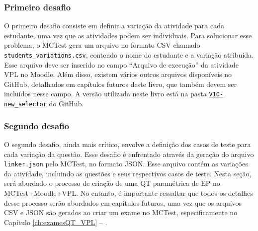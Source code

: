 \subsubsection{Primeiro desafio}

O primeiro desafio consiste em definir a variação da atividade para cada estudante, uma vez que as atividades podem ser individuais. Para solucionar esse problema, o MCTest gera um arquivo no formato CSV chamado \verb|students_variations.csv|, contendo o nome do estudante e a variação atribuída. Esse arquivo deve ser inserido no campo ``Arquivo de execução'' da atividade VPL no Moodle. Além disso, existem vários outros arquivos disponíveis no GitHub, detalhados em capítulos futuros deste livro, que também devem ser incluídos nesse campo. A versão utilizada neste livro está na pasta \href{https://github.com/fzampirolli/mctest/tree/master/VPL_modification}{\texttt{V10-new\_selector}} do GitHub.


\subsubsection{Segundo desafio}

O segundo desafio, ainda mais crítico, envolve a definição dos casos de teste para cada variação da questão. Esse desafio é enfrentado através da geração do arquivo \verb|linker.json| pelo MCTest, no formato JSON. Esse arquivo contém as variações da atividade, incluindo as questões e seus respectivos casos de teste. Nesta seção, será abordado o processo de criação de uma QT paramétrica de EP no MCTest+Moodle+VPL. No entanto, é importante ressaltar que todos os detalhes desse processo serão abordados em capítulos futuros, uma vez que os arquivos CSV e JSON são gerados ao criar um exame no MCTest, especificamente no Capítulo \ref{ch:examesQT_VPL} -- .

